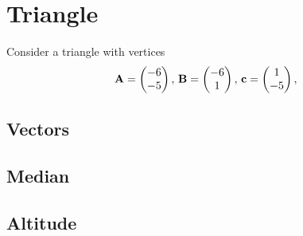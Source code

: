 \documentclass[11pt]{book}
\begin{document}
\frontmatter
\tableofcontents
\setcounter{page}{0}
\mainmatter
\chapter{Triangle}
Consider a triangle with vertices
\begin{align}
\label{eq:tri-pts}
\vec{A}=\myvec{-6 \\ -5},\,
\vec{B}=\myvec{-6\\1},\,
	\vec{c}=\myvec{1\\-5},\,
\end{align}

\section{Vectors}
\section{Median}
\section{Altitude}
\end{document}
